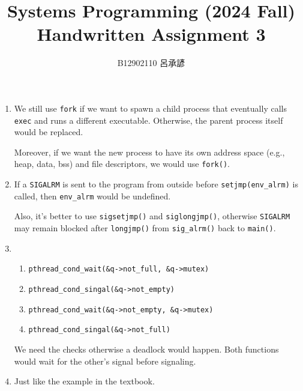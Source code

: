 \documentclass[12pt, a4paper]{article}
\title{
  \vspace{-1cm}
  Systems Programming (2024 Fall)\\
  Handwritten Assignment 3
}
\author{\Large B12902110 呂承諺}
\date{}
\begin{document}
  \maketitle
  \begin{enumerate}
    \item We still use \verb|fork| if we want to spawn a child process that
    eventually calls \verb|exec| and runs a different executable.
    Otherwise, the parent process itself would be replaced.

    Moreover, if we want the new process to have its own address space (e.g.,
    heap, data, bss) and file descriptors, we would use \verb|fork()|.

    \item If a \verb|SIGALRM| is sent to the program from outside before
    \verb|setjmp(env_alrm)| is called, then \verb|env_alrm| would be undefined.

    Also, it's better to use \verb|sigsetjmp()| and \verb|siglongjmp()|,
    otherwise \verb|SIGALRM| may remain blocked after \verb|longjmp()| from
    \verb|sig_alrm()| back to \verb|main()|.

    \item
    \begin{enumerate}[label=(\Alph*)]
      \item \verb|pthread_cond_wait(&q->not_full, &q->mutex)|
      \item \verb|pthread_cond_singal(&q->not_empty)|
      \item \verb|pthread_cond_wait(&q->not_empty, &q->mutex)|
      \item \verb|pthread_cond_singal(&q->not_full)|
    \end{enumerate}

    We need the checks otherwise a deadlock would happen.
    Both functions would wait for the other's signal before signaling.

    \item Just like the example in the textbook.
    \inputminted{c}{4_ipc.c}
  \end{enumerate}
\end{document}
